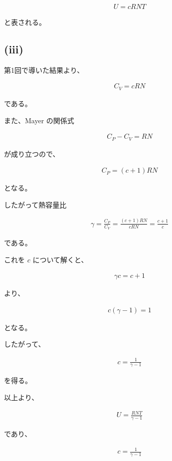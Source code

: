 \documentclass[platex,dvipdfmx,a4paper]{jsarticle}
\begin{document}
\begin{align*}
U=cRNT
\end{align*}

と表される。

\subsection{(iii)}

第1回で導いた結果より、

\begin{align*}
C_V=cRN
\end{align*}

である。

また、Mayer の関係式

\begin{align*}
C_P-C_V=RN
\end{align*}

が成り立つので、

\begin{align*}
C_P
=
(c+1)RN
\end{align*}

となる。

したがって熱容量比

\begin{align*}
\gamma
=
\frac{C_P}{C_V}
=
\frac{(c+1)RN}{cRN}
=
\frac{c+1}{c}
\end{align*}

である。

これを $c$ について解くと、

\begin{align*}
\gamma c
=
c+1
\end{align*}

より、

\begin{align*}
c(\gamma-1)
=
1
\end{align*}

となる。

したがって、

\begin{align*}
c
=
\frac{1}{\gamma-1}
\end{align*}

を得る。

以上より、

\begin{align*}
U
=
\frac{RNT}{\gamma-1}
\end{align*}

であり、

\begin{align*}
c
=
\frac{1}{\gamma-1}
\end{align*}
\end{document}
